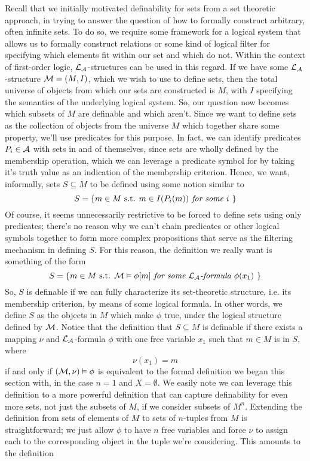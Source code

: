 \documentclass{article}
\begin{document}
\nn
Recall that we initially motivated definability for sets from a set theoretic approach, in trying to answer the question of how to formally construct arbitrary, often infinite sets. To do so, we require some framework for a logical system that allows us to formally construct relations or some kind of logical filter for specifying which elements fit within our set and which do not. Within the context of first-order logic, $ \mathcal{L}_{\mathcal{A}} $-structures can be used in this regard. If we have some $ \mathcal{L}_{\mathcal{A}} $-structure $ \mathcal{M} = (M, I) $, which we wish to use to define sets, then the total universe of objects from which our sets are constructed is $ M $, with $ I $ specifying the semantics of the underlying logical system. So, our question now becomes which subsets of $ M $ are definable and which aren't. Since we want to define sets as the collection of objects from the universe $ M $ which together share some property, we'll use predicates for this purpose. In fact, we can identify predicates $ P_i \in \mathcal{A} $ with sets in and of themselves, since sets are wholly defined by the membership operation, which we can leverage a predicate symbol for by taking it's truth value as an indication of the membership criterion. Hence, we want, informally, sets $ S \subseteq M $ to be defined using some notion similar to
    $$ S = \{ m \in M \textnormal{ s.t. } m \in I(P_i(m)) \textit{ for some $ i $ } \} $$
Of course, it seems unnecessarily restrictive to be forced to define sets using only predicates; there's no reason why we can't chain predicates or other logical symbols together to form more complex propositions that serve as the filtering mechanism in defining $ S $. For this reason, the definition we really want is something of the form
    $$ S = \{ m \in M \textnormal{ s.t. } \mathcal{M} \vDash \phi[m] \textit{ for some $ \mathcal{L}_{\mathcal{A}}$-formula $ \phi(x_1) $ } \} $$
So, $ S $ is definable if we can fully characterize its set-theoretic structure, i.e. its membership criterion, by means of some logical formula. In other words, we define $ S $ as the objects in $ M $ which make $ \phi $ true, under the logical structure defined by $ \mathcal{M} $. Notice that the definition that $ S \subseteq M $ is definable if there exists a mapping $ \nu $ and $ \mathcal{L}_{\mathcal{A}} $-formula $ \phi $ with one free variable $ x_1 $ such that $ m \in M $ is in $ S $, where
    $$ \nu(x_1) = m $$
if and only if $ (\mathcal{M}, \nu) \vDash \phi $ is equivalent to the formal definition we began this section with, in the case $ n = 1 $ and $ X = \emptyset $. We easily note we can leverage this definition to a more powerful definition that can capture definability for even more sets, not just the subsets of $ M $, if we consider subsets of $ M^n $. Extending the definition from sets of elements of $ M $ to sets of $ n $-tuples from $ M $ is straightforward; we just allow $ \phi $ to have $ n $ free variables and force $ \nu $ to assign each to the corresponding object in the tuple we're considering. This amounts to the definition
\end{document}
